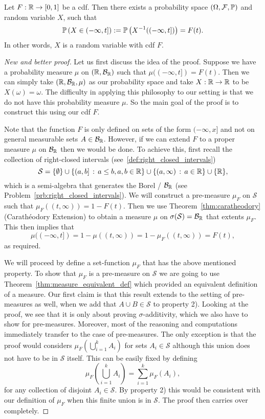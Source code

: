 \begin{theorem}\label{thm:construction_random_variable}
Let $F : \mathbb R \to [0,1]$ be a cdf. Then there exists a probability space  $(\Omega,\mathcal F, \mathbb P)$ and random variable $X$, such that 
\[
	\mathbb P\left(X \in (-\infty,t]\right) := \mathbb P\left(X^{-1}((-\infty,t])\right) = F(t).
\]
In other words, $X$ is a random variable with cdf $F$.
\end{theorem}

\begin{proof}[New and better proof]
Let us first discuss the idea of the proof. Suppose we have a probability measure $\mu$ on $(\mathbb R, \mathcal B_{\mathbb R})$ such that $\mu((-\infty,t]) = F(t)$. Then we can simply take $(\mathbb R, \mathcal B_{\mathbb R}, \mu)$ as our probability space and take $X : \mathbb R \to \mathbb R$ to be $X(\omega) = \omega$. The difficulty in applying this philosophy to our setting is that we do not have this probability measure $\mu$. So the main goal of the proof is to construct this using our cdf $F$. 

Note that the function $F$ is only defined on sets of the form $(-\infty,x]$ and not on general measurable sets $A \in \mathcal B_{\mathbb R}$. However, if we can extend $F$ to a proper measure $\mu$ on $\mathcal B_{\mathbb R}$ then we would be done. To achieve this, first recall the collection of right-closed intervals (see~\eqref{def:right_closed_intervals})
\[
	\mathcal{S} = \{\emptyset\} \cup \{(a,b] \, : \, a \le b, a,b \in \mathbb R\} \cup \{(a, \infty) \, : \, a \in \mathbb R\} \cup \{\mathbb R\},
\] 
which is a semi-algebra that generates the Borel \sigalg/ $\mathcal B_{\mathbb R}$ (see Problem~\ref{prb:right_closed_intervals}). We will construct a pre-measure $\mu_F$ on $\mathcal{S}$ such that $\mu_F((t,\infty)) = 1 - F(t)$. Then we use Theorem~\ref{thm:caratheodory} (Carath\'{e}odory Extension) to obtain a measure $\mu$ on $\sigma(\mathcal{S}) = \mathcal B_{\mathbb R}$ that extents $\mu_F$. This then implies that 
\[
	\mu((-\infty,t]) = 1 - \mu((t,\infty)) = 1 - \mu_F((t,\infty)) = F(t),
\]
as required. 

We will proceed by define a set-function $\mu_F$ that has the above mentioned property. To show that $\mu_F$ is a pre-measure on $\mathcal{S}$ we are going to use Theorem~\ref{thm:measure_equivalent_def} which provided an equivalent definition of a measure. Our first claim is that this result extends to the setting of pre-measures as well, when we add that $A \cup B \in \mathcal{S}$ to property 2). Looking at the proof, we see that it is only about proving $\sigma$-additivity, which we also have to show for pre-measures. Moreover, most of the reasoning and computations immediately transfer to the case of pre-measures. The only exception is that the proof would considers $\mu_F(\bigcup_{i = 1}^k A_i)$ for sets $A_i \in \mathcal{S}$ although this union does not have to be in $\mathcal{S}$ itself. This can be easily fixed by defining
\[
	\mu_F(\bigcup_{i = 1}^k A_i) = \sum_{i = 1}^k \mu_F(A_i),
\]
for any collection of disjoint $A_i \in \mathcal{S}$. By property 2) this would be consistent with our definition of $\mu_F$ when this finite union is in $\mathcal{S}$. The proof then carries over completely.


\end{proof}
